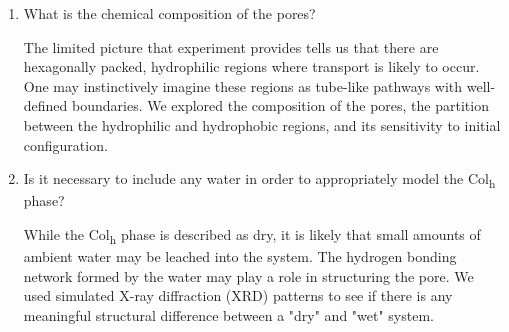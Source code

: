 \documentclass[journal=jpcbfk,manuscript=article]{achemso}
\begin{document}
\begin{enumerate}

	\item What is the chemical composition of the pores?\label{point:composition}

	The limited picture that experiment provides tells us that there are hexagonally packed, 
	hydrophilic regions where transport is likely to occur. One may instinctively imagine these 
	regions as tube-like pathways with well-defined boundaries. We explored the composition
	of the pores, the partition between the hydrophilic and hydrophobic regions, and its 
	sensitivity to initial configuration. 
	
    \item Is it necessary to include any water in order to appropriately model the 
    Col\textsubscript{h} phase? \label{point:water}

	While the Col\textsubscript{h} phase is described as dry, it is likely that small amounts of
	ambient water may be leached into the system. The hydrogen bonding network formed by the 
	water may play a role in structuring the pore. We used simulated X-ray diffraction (XRD) patterns
	to see if there is any meaningful structural difference between a "dry" and "wet" system.

  \end{enumerate}
  
%
\end{document}
